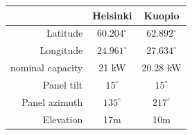 






\begin{table}[H]
\centering
\begin{tabular}{r|cc} \hline\hline

 & Helsinki & Kuopio\\ \hline
 Latitude & $60.204^\circ$ & $62.892^\circ$ \\
 Longitude & $24.961^\circ$  &  $27.634^\circ$\\
 \Gls{nominal capacity} &21 kW & 20.28 kW \\
 Panel \gls{tilt} & $15^\circ$ & $15^\circ$ \\
 Panel \gls{azimuth} & $135^\circ$ & $217^\circ$ \\
 Elevation & 17m & 10m\\
\hline\hline
\end{tabular}
\label{table_fmi_helsinki_kuopio_parameters}
\end{table}






